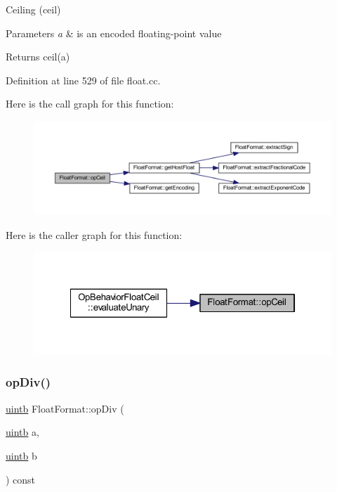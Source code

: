 Ceiling (ceil) 


\begin{DoxyParams}{Parameters}
{\em a} & is an encoded floating-\/point value \\
\hline
\end{DoxyParams}
\begin{DoxyReturn}{Returns}
ceil(a) 
\end{DoxyReturn}


Definition at line 529 of file float.\+cc.

Here is the call graph for this function\+:
\nopagebreak
\begin{figure}[H]
\begin{center}
\leavevmode
\includegraphics[width=350pt]{class_float_format_a997db68ddb2ee0835f3ffde93f4c4958_cgraph}
\end{center}
\end{figure}
Here is the caller graph for this function\+:
\nopagebreak
\begin{figure}[H]
\begin{center}
\leavevmode
\includegraphics[width=322pt]{class_float_format_a997db68ddb2ee0835f3ffde93f4c4958_icgraph}
\end{center}
\end{figure}
\mbox{\label{class_float_format_abcd8caf82f65bac1e32be3cecd9f80e3}} 
\subsubsection{\texorpdfstring{opDiv()}{opDiv()}}
{\footnotesize\ttfamily \mbox{\hyperlink{types_8h_a2db313c5d32a12b01d26ac9b3bca178f}{uintb}} Float\+Format\+::op\+Div (\begin{DoxyParamCaption}\item[{\mbox{\hyperlink{types_8h_a2db313c5d32a12b01d26ac9b3bca178f}{uintb}}}]{a,  }\item[{\mbox{\hyperlink{types_8h_a2db313c5d32a12b01d26ac9b3bca178f}{uintb}}}]{b }\end{DoxyParamCaption}) const}



